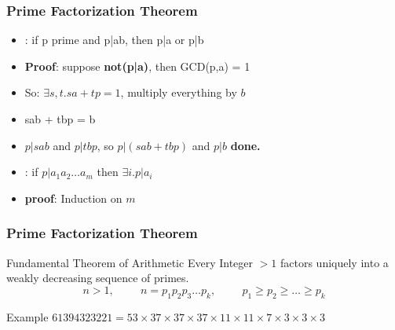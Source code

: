\documentclass{beamer}
\begin{document}
\begin{frame}
  \frametitle{Prime Factorization Theorem}

  {\larger             
  \begin{itemize}
  \item {}: if p prime and p|ab, then p|a or p|b
  \item<2-> {\bf Proof}: suppose {\bf not(p|a)}, then GCD(p,a) = 1
  \item<3-> So: $\exists s,t. sa+tp = 1$, multiply everything by $b$
  \item<4-> sab + tbp = b
  \item<4-> $p|sab$ and $p|tbp$, so $p|(sab+tbp)$ and $p|b$ {\bf done.}

    \bigskip

  \item<5> : if $p|a_1a_2\ldots a_m$ then $\exists i. p|a_i$
  \item<5> {\bf proof}: Induction on $m$    
  \end{itemize}

  }
\end{frame}

\begin{frame}
  \frametitle{Prime Factorization Theorem}

  {\larger
    \begin{block}{Fundamental Theorem of Arithmetic}
      Every Integer $> 1$ factors \alert{uniquely} into a
      weakly decreasing sequence of primes.
      \begin{equation*}
        n > 1, \hspace{1cm} n = p_1p_2p_3\ldots p_k, \hspace{1cm} p_1\geq p_2 \geq \ldots \geq p_k 
      \end{equation*}
    \end{block}

    \alert{Example} $61394323221 = 53\times37\times37\times37\times11\times11\times7\times3\times3\times3$
  }
\end{frame}
\end{document}
